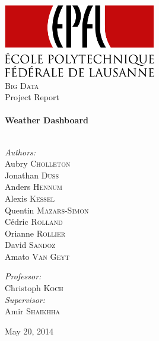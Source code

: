 \begin{titlepage}

\begin{center}


\includegraphics[width=0.50\textwidth]{./figures/logo}\\[3 cm]

\textsc{\large Big Data}\\[1.5cm]

{\Large Project Report}\\[0.5cm]


\HRule \\[0.4cm]
{ \huge \bfseries Weather Dashboard}\\[0.2cm]

\HRule \\[1.5cm]

\begin{minipage}{0.5\textwidth}
\begin{flushleft} \large
\emph{Authors:}\\
Aubry \textsc{Cholleton}\\
Jonathan \textsc{Duss}\\
Anders \textsc{Hennum}\\
Alexis \textsc{Kessel}\\
Quentin \textsc{Mazars-Simon}\\
Cédric \textsc{Rolland}\\
Orianne \textsc{Rollier}\\
David \textsc{Sandoz}\\
Amato \textsc{Van Geyt}
\end{flushleft}
\end{minipage}
\begin{minipage}{0.4\textwidth}
\begin{flushright} \large
\emph{Professor:} \\
Christoph \textsc{Koch} \\
\vspace{1cm}
\emph{Supervisor:} \\
Amir \textsc{Shaikhha} \\
\end{flushright}
\end{minipage}

\vfill

{\large May 20, 2014}

\end{center}

\end{titlepage} 